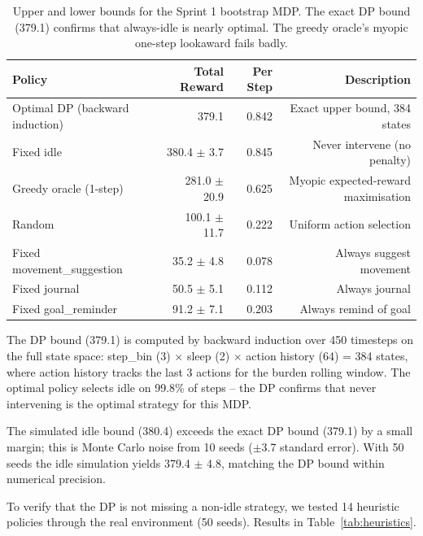 \documentclass[11pt]{article}
\begin{document}
\begin{table}[h]
\centering
\begin{tabular}{lrrr}
\toprule
Policy & Total Reward & Per Step & Description \\
\midrule
Optimal DP (backward induction) & 379.1 & 0.842 & Exact upper bound, 384 states \\
Fixed idle & 380.4 $\pm$ 3.7 & 0.845 & Never intervene (no penalty) \\
Greedy oracle (1-step) & 281.0 $\pm$ 20.9 & 0.625 & Myopic expected-reward maximisation \\
Random & 100.1 $\pm$ 11.7 & 0.222 & Uniform action selection \\
Fixed movement\_suggestion & 35.2 $\pm$ 4.8 & 0.078 & Always suggest movement \\
Fixed journal & 50.5 $\pm$ 5.1 & 0.112 & Always journal \\
Fixed goal\_reminder & 91.2 $\pm$ 7.1 & 0.203 & Always remind of goal \\
\bottomrule
\end{tabular}
\caption{Upper and lower bounds for the Sprint 1 bootstrap MDP. The exact DP bound (379.1) confirms that always-idle is nearly optimal. The greedy oracle's myopic one-step lookaward fails badly.}
\end{table}

The DP bound (379.1) is computed by backward induction over 450 timesteps on the full state space: step\_bin (3) $\times$ sleep (2) $\times$ action history (64) = 384 states, where action history tracks the last 3 actions for the burden rolling window. The optimal policy selects idle on 99.8\% of steps -- the DP confirms that never intervening is the optimal strategy for this MDP.

The simulated idle bound (380.4) exceeds the exact DP bound (379.1) by a small margin; this is Monte Carlo noise from 10 seeds ($\pm$3.7 standard error). With 50 seeds the idle simulation yields 379.4 $\pm$ 4.8, matching the DP bound within numerical precision.

To verify that the DP is not missing a non-idle strategy, we tested 14 heuristic policies through the real environment (50 seeds). Results in Table~\ref{tab:heuristics}.
\end{document}
